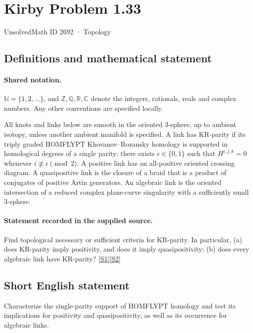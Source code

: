 \documentclass[11pt]{article}
\newcommand{\sref}[2]{\hyperlink{source:#1:#2}{[S#2]}}
\begin{document}
\setcounter{section}{2691}
\section{Kirby Problem 1.33}\label{2692}
{\small\sffamily UnsolvedMath ID 2692 · Topology}
\subsection{Definitions and mathematical statement}

\paragraph{Shared notation.}$\mathbb N=\{1,2,\ldots\}$, and $\mathbb Z,\mathbb Q,\mathbb R,\mathbb C$ denote the integers, rationals, reals and complex numbers. Any other conventions are specified locally.


All knots and links below are smooth in the oriented $3$-sphere, up to ambient isotopy, unless another ambient manifold is specified. A link has KR-parity if its triply graded HOMFLYPT Khovanov--Rozansky homology is supported in homological degrees of a single parity: there exists $\epsilon\in\{0,1\}$ such that $H^{i,j,k}=0$ whenever $i\not\equiv\epsilon\pmod2$. A positive link has an all-positive oriented crossing diagram. A quasipositive link is the closure of a braid that is a product of conjugates of positive Artin generators. An algebraic link is the oriented intersection of a reduced complex plane-curve singularity with a sufficiently small $3$-sphere.
\paragraph{Statement recorded in the supplied source.}
Find topological necessary or sufficient criteria for KR-parity. In particular, (a) does KR-parity imply positivity, and does it imply quasipositivity; (b) does every algebraic link have KR-parity? \sref{2692}{1}\sref{2692}{2}
\subsection{Short English statement}
Characterize the single-parity support of HOMFLYPT homology and test its implications for positivity and quasipositivity, as well as its occurrence for algebraic links.
\end{document}
